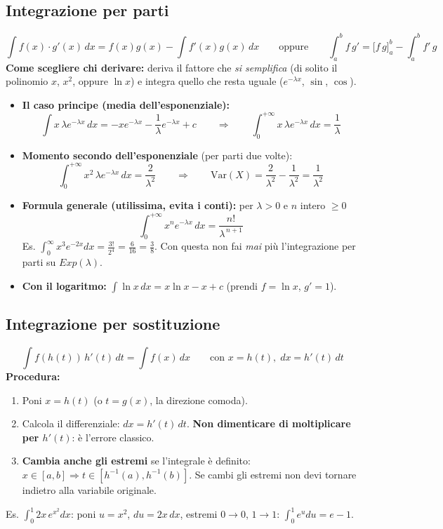 \documentclass[12pt]{extarticle} %
\begin{document}
\subsection{Integrazione per parti}
\[
\int f(x)\cdot g'(x)\,dx = f(x)g(x) - \int f'(x)g(x)\,dx
\qquad\text{oppure}\qquad
\int_a^b f\,g' = \big[f\,g\big]_a^b - \int_a^b f'\,g
\]
\noindent\textbf{Come scegliere chi derivare:} deriva il fattore che \emph{si semplifica} (di solito il polinomio $x$, $x^2$, oppure $\ln x$) e integra quello che resta uguale ($e^{-\lambda x}$, $\sin$, $\cos$).

\begin{itemize}
    \item \textbf{Il caso principe (media dell'esponenziale):}
    \[
    \int x\,\lambda e^{-\lambda x}\,dx = -x e^{-\lambda x} - \frac{1}{\lambda}e^{-\lambda x} + c
    \qquad\Longrightarrow\qquad
    \int_0^{+\infty} x\,\lambda e^{-\lambda x}\,dx = \frac{1}{\lambda}
    \]
    \item \textbf{Momento secondo dell'esponenziale} (per parti due volte):
    \[
    \int_0^{+\infty} x^2\,\lambda e^{-\lambda x}\,dx = \frac{2}{\lambda^2}
    \qquad\Longrightarrow\qquad
    \mathrm{Var}(X) = \frac{2}{\lambda^2} - \frac{1}{\lambda^2} = \frac{1}{\lambda^2}
    \]
    \item \textbf{Formula generale (utilissima, evita i conti):} per $\lambda>0$ e $n$ intero $\ge 0$
    \[
    \boxed{\;\int_0^{+\infty} x^{n} e^{-\lambda x}\,dx = \frac{n!}{\lambda^{\,n+1}}\;}
    \]
    {\footnotesize Es. $\int_0^{\infty} x^3 e^{-2x}dx = \frac{3!}{2^4} = \frac{6}{16} = \frac38$. Con questa non fai \emph{mai} più l'integrazione per parti su $Exp(\lambda)$.}
    \item \textbf{Con il logaritmo:} $\displaystyle\int \ln x\,dx = x\ln x - x + c$ \; (prendi $f=\ln x$, $g'=1$).
\end{itemize}

\subsection{Integrazione per sostituzione}
\[
\int f(h(t))\,h'(t)\,dt = \int f(x)\,dx \qquad \text{con } x = h(t),\; dx = h'(t)\,dt
\]
\noindent\textbf{Procedura:}
\begin{enumerate}
    \item Poni $x = h(t)$ (o $t = g(x)$, la direzione comoda).
    \item Calcola il differenziale: $dx = h'(t)\,dt$. \textbf{Non dimenticare di moltiplicare per $h'(t)$}: è l'errore classico.
    \item \textbf{Cambia anche gli estremi} se l'integrale è definito: $x\in[a,b] \Rightarrow t\in[h^{-1}(a),h^{-1}(b)]$. {\footnotesize Se cambi gli estremi non devi tornare indietro alla variabile originale.}
\end{enumerate}
{\footnotesize Es. $\int_0^{1} 2x\,e^{x^2}dx$: poni $u = x^2$, $du = 2x\,dx$, estremi $0 \to 0$, $1 \to 1$: $\int_0^1 e^u du = e - 1$.}
\end{document}
